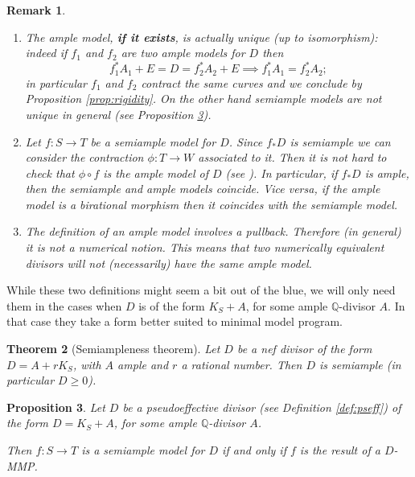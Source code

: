 \documentclass[a4paper,11pt]{amsart}
\newtheorem{theorem}{Theorem}[section]
\newtheorem{proposition}[theorem]{Proposition}
\newtheorem{remark}[theorem]{Remark}
\newcommand{\QQ}{\mathbb{Q}}
\begin{document}
\begin{remark}\leavevmode \label{rem:(semi)ampleModels}
	\begin{enumerate}
	\item 
	\emph{The} ample model, \textbf{if it exists}, is actually unique (up to isomorphism):
	indeed if $f_1$ and $f_2$ are two ample models for $D$ then
	\[
	f_1^*A_1 + E = D = f_2^*A_2 + E \implies f_1^*A_1 = f_2^*A_2;
	\]
	in particular $f_1$ and $f_2$ contract the same curves and we conclude by Proposition \ref{prop:rigidity}. 	
	On the other hand semiample models are not unique in general (see Proposition \ref{prop:semiampleM=minimalM}).
	
	\item\label{it:(semi)ampleModels2} Let $f\colon S \to T$ be a semiample model for $D$.
	Since $f_*D$ is semiample we can consider the contraction $\phi\colon T \to W$ associated to it.
	Then it is not hard to check that $\phi\circ f$ is the ample model of $D$ (see \cite[16.33 Lemma]{Cremona}).
	In particular, if $f_*D$ is ample, then the semiample and ample models coincide.
	Vice versa, if the ample model is a birational morphism then it coincides with the semiample model.
	
	\item The definition of an ample model involves a pullback.
	Therefore (in general) it is not a numerical notion.
	This means that two numerically equivalent divisors will not (necessarily) have the same ample model.
	\end{enumerate}
\end{remark}

While these two definitions might seem a bit out of the blue, we will only need them in the cases when $D$ is of the form $K_S + A$, for some ample $\QQ$-divisor $A$.
In that case they take a form better suited to minimal model program.

\begin{theorem}[{Semiampleness theorem}]\label{thm:semiampleness}
	Let $D$ be a nef divisor of the form $D = A + rK_S$, with $A$ ample and $r$ a rational number.
	Then $D$ is semiample (in particular $D \geq 0$). 
\end{theorem}



\begin{proposition}\label{prop:semiampleM=minimalM}
	Let $D$ be a pseudoeffective divisor (see Definition \ref{def:pseff}) of the form $D = K_S + A$, for some ample $\QQ$-divisor $A$.
	
	Then $f\colon S \to T$ is a semiample model for $D$ if and only if $f$ is the result of a $D$-MMP.
\end{proposition}
\end{document}
